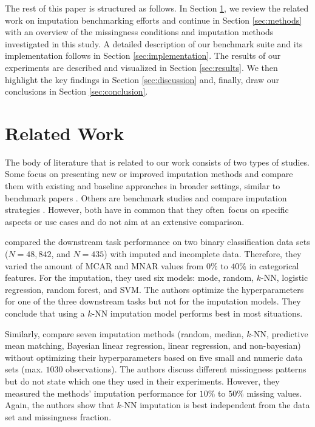 \documentclass[utf8]{frontiersSCNS} %
\begin{document}
The rest of this paper is structured as follows. In Section \ref{sec:related_work}, we review the related work on imputation benchmarking efforts and continue in Section \ref{sec:methods} with an overview of the missingness conditions and imputation methods investigated in this study. A detailed description of our benchmark suite and its implementation follows in Section \ref{sec:implementation}. The results of our experiments are described and visualized in Section \ref{sec:results}. We then highlight the key findings in Section \ref{sec:discussion} and, finally, draw our conclusions in Section \ref{sec:conclusion}.


\section{Related Work}
\label{sec:related_work}
%
The body of literature that is related to our work consists of two types of studies. Some focus on presenting new or improved imputation methods and compare them with existing and baseline approaches in broader settings, similar to benchmark papers \citep{Imputation_Benchmark_4, Imputation_Benchmark_6}. Others are benchmark studies and compare imputation strategies \citep{Imputation_Benchmark_1, Imputation_Benchmark_2, Imputation_Benchmark_3}. However, both have in common that they often focus on specific aspects or use cases and do not aim at an extensive comparison.

\cite{Imputation_Benchmark_3} compared the downstream task performance on two binary classification data sets ($N = 48,842$, and $N = 435$) with imputed and incomplete data. Therefore, they varied the amount of MCAR and MNAR values from $0\%$ to $40\%$ in categorical features. For the imputation, they used six models: mode, random, $k$-NN, logistic regression, random forest, and SVM. The authors optimize the hyperparameters for one of the three downstream tasks but not for the imputation models. They conclude that using a $k$-NN imputation model performs best in most situations.

Similarly, \cite{Imputation_Benchmark_2} compare seven imputation methods (random, median, $k$-NN, predictive mean matching, Bayesian linear regression, linear regression, and non-bayesian) without optimizing their hyperparameters based on five small and numeric data sets (max. $1030$ observations). The authors discuss different missingness patterns but do not state which one they used in their experiments. However, they measured the methods' imputation performance for $10\%$ to $50\%$ missing values. Again, the authors show that $k$-NN imputation is best independent from the data set and missingness fraction.
\end{document}
